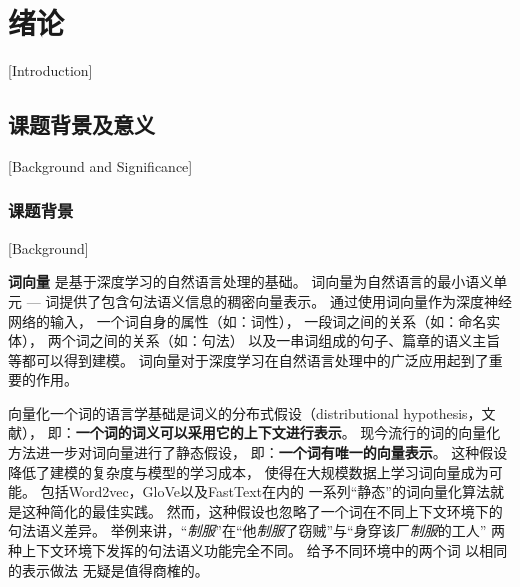 
\chapter{绪论}[Introduction]\label{chp:intro}

\section{课题背景及意义}[Background and Significance]

\subsection{课题背景}[Background]

\textbf{词向量}\cite{DBLP:journals/corr/abs-1301-3781,NIPS2013_5021,pennington-socher-manning:2014:EMNLP2014,Q17-1010}
是基于深度学习的自然语言处理的基础。
词向量为自然语言的最小语义单元 --- 词提供了包含句法语义信息的稠密向量表示。
通过使用词向量作为深度神经网络的输入，
一个词自身的属性（如：词性\cite{DBLP:journals/corr/HuangXY15}），
一段词之间的关系（如：命名实体\cite{lample-EtAl:2016:N16-1}），
两个词之间的关系（如：句法\cite{dyer-EtAl:2015:ACL-IJCNLP,DBLP:journals/corr/DozatM16}）
以及一串词组成的句子、篇章的语义主旨\cite{kim-rush:2016:EMNLP2016}
等都可以得到建模。
词向量对于深度学习在自然语言处理中的广泛应用起到了重要的作用。

向量化一个词的语言学基础是词义的分布式假设（distributional hypothesis，文献），
即：\textbf{一个词的词义可以采用它的上下文进行表示}。
现今流行的词的向量化方法进一步对词向量进行了静态假设，
即：\textbf{一个词有唯一的向量表示}。
这种假设降低了建模的复杂度与模型的学习成本，
使得在大规模数据上学习词向量成为可能。
包括Word2vec\cite{DBLP:journals/corr/abs-1301-3781,NIPS2013_5021}，GloVe\cite{pennington-socher-manning:2014:EMNLP2014}以及FastText\cite{Q17-1010}在内的
一系列``静态''的词向量化算法就是这种简化的最佳实践。
然而，这种假设也忽略了一个词在不同上下文环境下的句法语义差异。
举例来讲，``\textit{制服}''在``他\textit{制服}了窃贼''与``身穿该厂\textit{制服}的工人''
两种上下文环境下发挥的句法语义功能完全不同。\cite{guo-EtAl:2014:Coling}
给予不同环境中的两个词
以相同的表示做法
无疑是值得商榷的。

